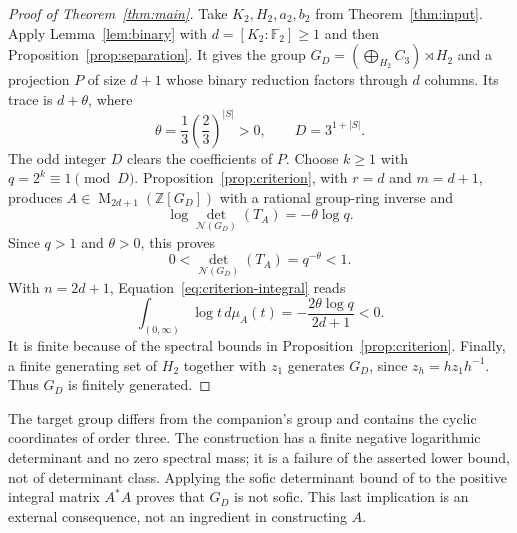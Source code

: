 \documentclass[11pt]{article}
\theoremstyle{remark}
\numberwithin{equation}{section}
\newcommand{\F}{\mathbb F}
\newcommand{\Z}{\mathbb Z}
\newcommand{\Mat}{\operatorname{M}}
\newcommand{\N}{\mathcal N}
\begin{document}
\begin{proof}[Proof of Theorem~\ref{thm:main}]
Take $K_2,H_2,a_2,b_2$ from Theorem~\ref{thm:input}. Apply
Lemma~\ref{lem:binary} with $d=[K_2:\F_2]\ge1$ and then
Proposition~\ref{prop:separation}. It gives the group
$G_D=(\bigoplus_{H_2}C_3)\rtimes H_2$ and a projection $P$
of size $d+1$ whose binary reduction factors through $d$ columns.
Its trace is $d+\theta$, where
\[
 \theta=\frac13\left(\frac23\right)^{|S|}>0,
 \qquad D=3^{1+|S|}.
\]
The odd integer $D$ clears the coefficients of $P$. Choose
$k\ge1$ with $q=2^k\equiv1\pmod D$.
Proposition~\ref{prop:criterion}, with $r=d$ and $m=d+1$,
produces $A\in\Mat_{2d+1}(\Z[G_D])$ with a rational group-ring
inverse and
\[
 \log\det_{\N(G_D)}(T_A)=-\theta\log q.
\]
Since $q>1$ and $\theta>0$, this proves
\begin{equation}\label{eq:final-det}
 0<\det_{\N(G_D)}(T_A)=q^{-\theta}<1.
\end{equation}
With $n=2d+1$, Equation~\eqref{eq:criterion-integral} reads
\begin{equation}\label{eq:final-integral}
 \int_{(0,\infty)}\log t\,d\mu_A(t)
 =-\frac{2\theta\log q}{2d+1}<0.
\end{equation}
It is finite because of the spectral bounds in
Proposition~\ref{prop:criterion}. Finally, a finite generating
set of $H_2$ together with $z_1$ generates $G_D$, since
$z_h=hz_1h^{-1}$. Thus $G_D$ is finitely generated.
\end{proof}

The target group differs from the companion's group and contains
the cyclic coordinates of order three. The construction has a
finite negative logarithmic determinant and no zero spectral mass;
it is a failure of the asserted lower bound, not of determinant
class. Applying the sofic determinant bound of
\cite[Theorem 5]{ElekSzabo2005} to the positive integral matrix
$A^*A$ proves that $G_D$ is not sofic. This last implication is an
external consequence, not an ingredient in constructing $A$.

\begingroup
\raggedright


\endgroup
\end{document}
